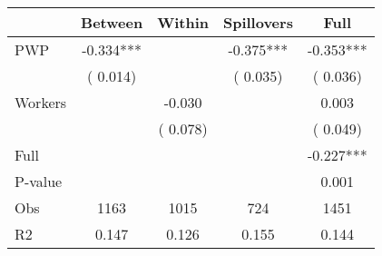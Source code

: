 
\begin{tabular}{l*{4}{c}}\hline&\multicolumn{1}{c}{Between}&\multicolumn{1}{c}{Within}&\multicolumn{1}{c}{Spillovers}&\multicolumn{1}{c}{Full}\\ \hline
 PWP           &             -0.334***      &                                               &       -0.375*** &        -0.353***                            \\ 
                               &        (       0.014)           &                                       &       (       0.035)     &      (       0.036)                                           \\ 
 Workers       &                                               &       -0.030    &                                &             0.003                            \\ 
                               &                                               & (       0.078)                  &                                        &      (       0.049)                                           \\ 
\hline                                                                                                                                                                                                                                            
 Full                  &                                               &                                               &                                        &            -0.227***                                     \\ 
 P-value               &                                               &                                               &                                        &             0.001                                           \\ 
 Obs                   &               1163               &       1015                       &       724                &              1451                                               \\ 
 R2                    &                      0.147              &              0.126                      &              0.155               &                     0.144                                              \\ 
\hline \end{tabular}                                                                                                                                                                                                              